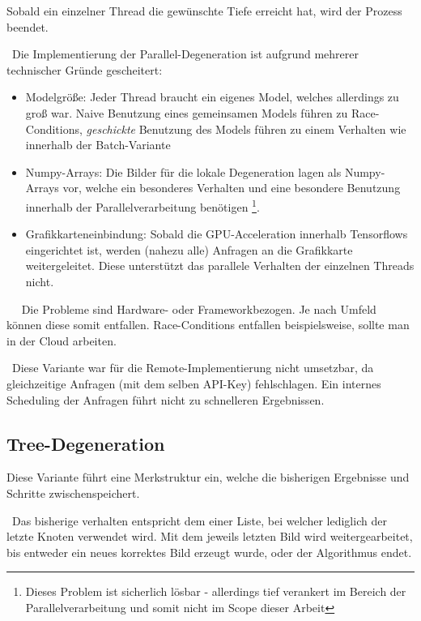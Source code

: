 Sobald ein einzelner Thread die gewünschte Tiefe erreicht hat, wird der Prozess beendet. 

~\newline Die Implementierung der Parallel-Degeneration ist aufgrund mehrerer technischer Gründe gescheitert: 

\begin{itemize}
	\item Modelgröße: Jeder Thread braucht ein eigenes Model, welches allerdings zu groß war. Naive Benutzung eines gemeinsamen Models führen zu Race-Conditions, \textit{geschickte} Benutzung des Models führen zu einem Verhalten wie innerhalb der Batch-Variante
	\item Numpy-Arrays: Die Bilder für die lokale Degeneration lagen als Numpy-Arrays vor, welche ein besonderes Verhalten und eine besondere Benutzung innerhalb der Parallelverarbeitung benötigen \footnote{Dieses Problem ist sicherlich lösbar - allerdings tief verankert im Bereich der Parallelverarbeitung und somit nicht im Scope dieser Arbeit}. 
	\item Grafikkarteneinbindung: Sobald die GPU-Acceleration innerhalb Tensorflows eingerichtet ist, werden (nahezu alle) Anfragen an die Grafikkarte weitergeleitet. Diese unterstützt das parallele Verhalten der einzelnen Threads nicht. 
\end{itemize} 
~\newline ~\newline
Die Probleme sind Hardware- oder Frameworkbezogen. Je nach Umfeld können diese somit entfallen. Race-Conditions entfallen beispielsweise, sollte man in der Cloud arbeiten.

~\newline Diese Variante war für die Remote-Implementierung nicht umsetzbar, da gleichzeitige Anfragen (mit dem selben API-Key) fehlschlagen. Ein internes Scheduling der Anfragen führt nicht zu schnelleren Ergebnissen. 
\subsection{Tree-Degeneration}
Diese Variante führt eine Merkstruktur ein, welche die bisherigen Ergebnisse und Schritte zwischenspeichert. 

~\newline Das bisherige verhalten entspricht dem einer Liste, bei welcher lediglich der letzte Knoten verwendet wird. Mit dem jeweils letzten Bild wird weitergearbeitet, bis entweder ein neues korrektes Bild erzeugt wurde, oder der Algorithmus endet. 


